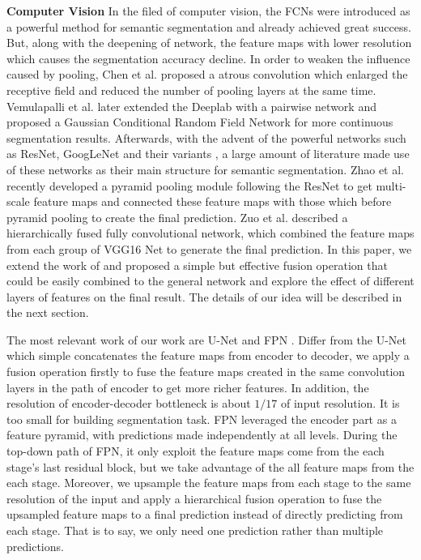 \textbf{Computer Vision} In the filed of computer vision, the FCNs \cite{IEEEexample:Long_2015_CVPR} were introduced as a powerful method for semantic segmentation and already achieved great success.
 But, along with the deepening of network, the feature maps with lower resolution which causes the segmentation accuracy decline. 
 In order to weaken the influence caused by pooling, Chen et al.\cite{IEEEexample:chen2016deeplab} proposed a atrous convolution which enlarged the receptive field and reduced the number of pooling layers at the same time. 
 Vemulapalli et al.\cite{IEEEexample:vemulapalli2016gaussian} later extended the Deeplab \cite{IEEEexample:chen2016deeplab} with a pairwise network and proposed a Gaussian Conditional Random Field Network for more continuous segmentation results.
 Afterwards, with the advent of the powerful networks such as ResNet\cite{IEEEexample:he2016deep}, GoogLeNet\cite{IEEEexample:szegedy2015going} and their variants \cite{IEEEexample:szegedy2016rethinking}\cite{IEEEexample:szegedy2017inception}\cite{IEEEexample:xie2017aggregated}, a large amount of literature made use of these networks as their main structure for semantic segmentation.
 Zhao et al.\cite{IEEEexample:zhao2017contextually} recently developed a pyramid pooling module following the ResNet\cite{IEEEexample:he2016deep} to get multi-scale feature maps and connected these feature maps with those which before pyramid pooling to create the final prediction. 
 Zuo et al.\cite{IEEEexample:zuo2016hf} described a hierarchically fused fully convolutional network, which combined the feature maps from each group of VGG16 Net to generate the final prediction.
 In this paper, we extend the work of\cite{IEEEexample:zuo2016hf} and proposed a simple but effective fusion operation that could be easily combined to the general network and explore the effect of different layers of features on the final result. The details of our idea will be described in the next section.


The most relevant work of our work are U-Net\cite{IEEEexample:ronneberger2015u} and FPN \cite{IEEEexample:lin2017feature}. Differ from the U-Net which simple concatenates the feature maps from encoder to decoder, we apply a fusion operation firstly to fuse the feature maps created in the same convolution layers in the path of encoder to get more richer features. In addition, the resolution of encoder-decoder bottleneck is about ${1/17}$ of input resolution. It is too small for building segmentation task. FPN leveraged the encoder part as a feature pyramid, with predictions made independently at all levels. During the top-down path of FPN, it only exploit the feature maps come from the each stage's last residual block, but we take advantage of the all feature maps from the each stage. Moreover, we upsample the feature maps from each stage to the same resolution of the input and apply a hierarchical fusion operation to fuse the upsampled feature maps to a final prediction instead of directly predicting from each stage. That is to say, we only need one prediction rather than multiple predictions.

 
 
 




